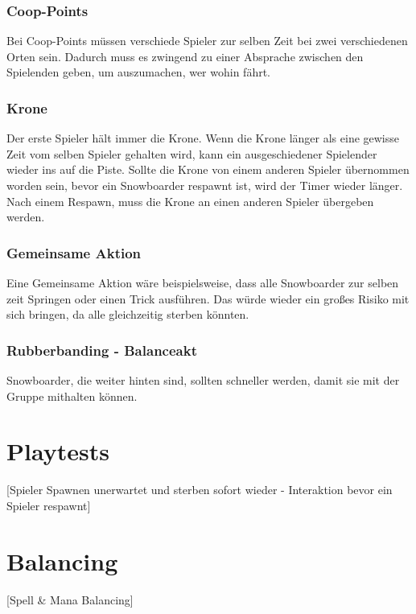 \subsubsection{Coop-Points}
Bei Coop-Points müssen verschiede Spieler zur selben Zeit bei zwei verschiedenen Orten sein. Dadurch muss es zwingend zu einer Absprache zwischen den Spielenden geben, um auszumachen, wer wohin fährt.

\subsubsection{Krone}
Der erste Spieler hält immer die Krone. Wenn die Krone länger als eine gewisse Zeit vom selben Spieler gehalten wird, kann ein ausgeschiedener Spielender wieder ins auf die Piste. Sollte die Krone von einem anderen Spieler übernommen worden sein, bevor ein Snowboarder respawnt ist, wird der Timer wieder länger. Nach einem Respawn, muss die Krone an einen anderen Spieler übergeben werden.

\subsubsection{Gemeinsame Aktion}
Eine Gemeinsame Aktion wäre beispielsweise, dass alle Snowboarder zur selben zeit Springen oder einen Trick ausführen. Das würde wieder ein großes Risiko mit sich bringen, da alle gleichzeitig sterben könnten.

\subsubsection{Rubberbanding - Balanceakt}
Snowboarder, die weiter hinten sind, sollten schneller werden, damit sie mit der Gruppe mithalten können. 

\section{Playtests}

[Spieler Spawnen unerwartet und sterben sofort wieder - Interaktion bevor ein Spieler respawnt]

\section{Balancing}

[Spell \& Mana Balancing]
